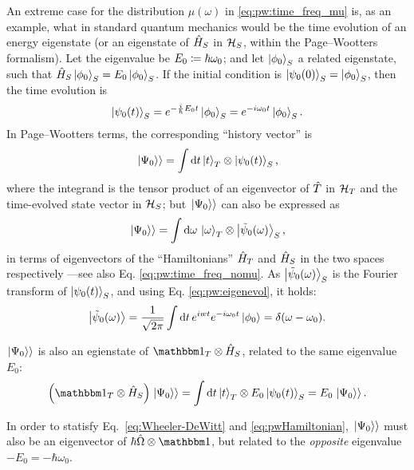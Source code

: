 An extreme case for the distribution %
$\mu(\omega)$ in \eqref{eq:pw:time_freq_mu} %
is, as an example, what in standard quantum mechanics would be the time evolution of an energy eigenstate
(or an eigenstate of $\hat{H}_S$ in $\mathcal{H}_S$, within the Page--Wootters formalism).
Let the eigenvalue be $E_0 \coloneqq \hbar\omega_{0}$;
and let $\ket{\phi_0}_S$ a related eigenstate, such that $\hat{H}_{S}\ket{\phi_0}_S = E_{0}\ket{\phi_0}_S$.
If the initial condition is $\ket{\psi_{0}(0)}_S = \ket{\phi_0}_S$, then the time evolution is
\begin{equation}\label{eq:pw:eigenevol}
  \ket{\psi_{0}(t)}_S = e^{-\frac{i}{\hbar}E_{0}t}\ket{\phi_0}_S = e^{-i \omega_{0} t}\ket{\phi_0}_S \text{.}
\end{equation}
%
In Page--Wootters terms, the corresponding ``history vector'' is
\begin{equation*}
  \left.\left| \Psi_0 \right\rangle\right\rangle = \int \dd{t} \ket{t}_T \otimes \ket{\psi_0(t)}_S \text{,}
\end{equation*}
where the integrand is the tensor product of an eigenvector of $\hat{T}$ in $\mathcal{H}_T$
and the time-evolved state vector in $\mathcal{H}_S$;
but $\left.\left| \Psi_0 \right\rangle\right\rangle$ can also be expressed as
\begin{equation*}
  \left.\left| \Psi_0 \right\rangle\right\rangle = \int \dd{\omega} \, \ket{\omega}_{T}\otimes\ket{\tilde{\psi}_{0}(\omega)}_{S} \text{,}
\end{equation*}
in terms of eigenvectors of the ``Hamiltonians''
$\hat{H}_T$ and $\hat{H}_S$ in the two spaces respectively %
---see also Eq. \eqref{eq:pw:time_freq_nomu}.
%
As $\ket{\tilde{\psi}_{0}(\omega)}_{S}$ is the Fourier transform of $\ket{\psi_0(t)}_S$, and using Eq. \eqref{eq:pw:eigenevol}, it holds:
\[
  \ket{\tilde{\psi}_0(\omega)} = \frac{1}{\sqrt{2\pi}} \int \dd{t} e^{iwt} e^{-i\omega_{0}t} \ket{\phi_0}
  = \delta(\omega-\omega_0) \text{.}
\]

$\left.\left| \Psi_0 \right\rangle\right\rangle$ is also an egienstate of $\idop_T \ox \op{H}_S$, related to the same eigenvalue $E_0$:
\[
  \qty(\idop_T \ox \op{H}_S) \dket{\Psi_0} = \int \dd{t} \ket{t}_T \ox E_0 \ket{\psi_{0}(t)}_S = E_0 \dket{\Psi_0} \text{.}
\]

In order to statisfy Eq.~\eqref{eq:Wheeler-DeWitt} and \eqref{eq:pwHamiltonian},
$\left.\left| \Psi_0 \right\rangle\right\rangle$ must also be an eigenvector of $\hbar\op{\Omega} \ox \idop$,
but related to the \emph{opposite} eigenvalue $-E_0 = -\hbar\omega_0$.

